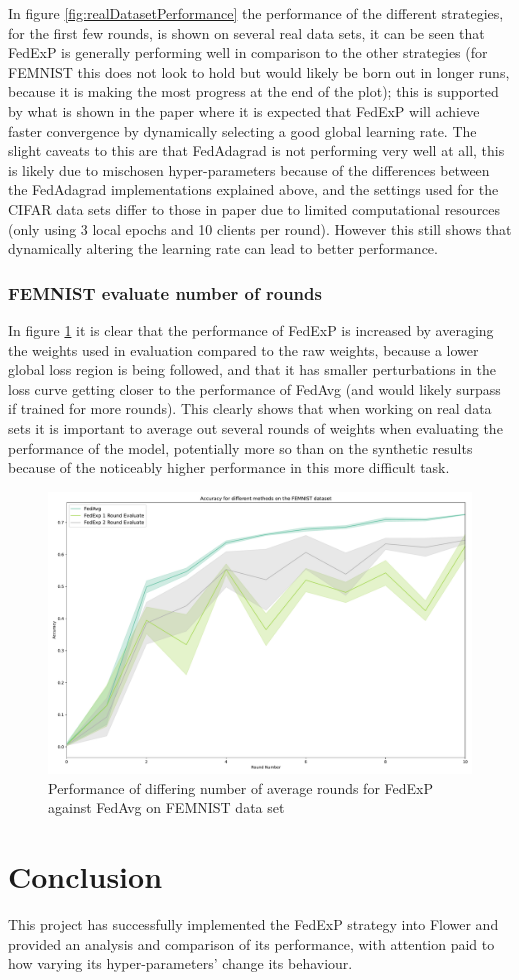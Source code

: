 \documentclass{article}
\begin{document}
In figure \ref{fig:realDatasetPerformance} the performance of the different strategies, for the first few rounds, is shown on several real data sets, it can be seen that FedExP is generally performing well in comparison to the other strategies (for FEMNIST this does not look to hold but would likely be born out in longer runs, because it is making the most progress at the end of the plot); this is supported by what is shown in the paper where it is expected that FedExP will achieve faster convergence by dynamically selecting a good global learning rate.  The slight caveats to this are that FedAdagrad is not performing very well at all, this is likely due to mischosen hyper-parameters because of the differences between the FedAdagrad implementations explained above, and the settings used for the CIFAR data sets differ to those in paper due to limited computational resources (only using 3 local epochs and 10 clients per round).  However this still shows that dynamically altering the learning rate can lead to better performance.

\subsubsection{FEMNIST evaluate number of rounds}

In figure \ref{fig:femnistDifferentNumberOfEvaluateRounds} it is clear that the performance of FedExP is increased by averaging the weights used in evaluation compared to the raw weights, because a lower global loss region is being followed, and that it has smaller perturbations in the loss curve getting closer to the performance of FedAvg (and would likely surpass if trained for more rounds).  This clearly shows that when working on real data sets it is important to average out several rounds of weights when evaluating the performance of the model, potentially more so than on the synthetic results because of the noticeably higher performance in this more difficult task.

\begin{figure}
    \centerline{\includegraphics[width=.6\linewidth]{figs/femnist_fedexp_fedavg_evaluateRounds.pdf}}
    \caption{Performance of differing number of average rounds for FedExP against FedAvg on FEMNIST data set}
    \label{fig:femnistDifferentNumberOfEvaluateRounds}
\end{figure}

\section{Conclusion}

This project has successfully implemented the FedExP strategy into Flower and provided an analysis and comparison of its performance, with attention paid to how varying its hyper-parameters' change its behaviour.


\end{document}
